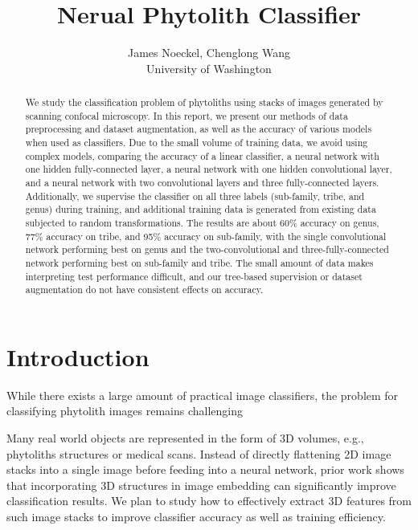 \documentclass{article}
\title{Nerual Phytolith Classifier}
\author{
  James Noeckel, Chenglong Wang\\
  University of Washington
}
\begin{document}

\maketitle

\begin{abstract}
  We study the classification problem of phytoliths using stacks of images generated by scanning confocal microscopy. In this report, we present our methods of data preprocessing and dataset augmentation, as well as the accuracy of various models when used as classifiers. Due to the small volume of training data, we avoid using complex models, comparing the accuracy of a linear classifier, a neural network with one hidden fully-connected layer, a neural network with one hidden convolutional layer, and a neural network with two convolutional layers and three fully-connected layers. Additionally, we supervise the classifier on all three labels (sub-family, tribe, and genus) during training, and additional training data is generated from existing data subjected to random transformations. The results are about 60\% accuracy on genus, 77\% accuracy on tribe, and 95\% accuracy on sub-family, with the single convolutional network performing best on genus and the two-convolutional and three-fully-connected network performing best on sub-family and tribe. The small amount of data makes interpreting test performance difficult, and our tree-based supervision or dataset augmentation do not have consistent effects on accuracy.
\end{abstract}

\section{Introduction}

While there exists a large amount of practical image classifiers, the problem for classifying phytolith images remains challenging

Many real world objects are represented in the form of 3D volumes, e.g., phytoliths structures or medical scans. Instead of directly flattening 2D image stacks into a single image before feeding into a neural network, prior work shows that incorporating 3D structures in image embedding can significantly improve classification results. We plan to study how to effectively extract 3D features from such image stacks to improve classifier accuracy as well as training efficiency.
\end{document}
